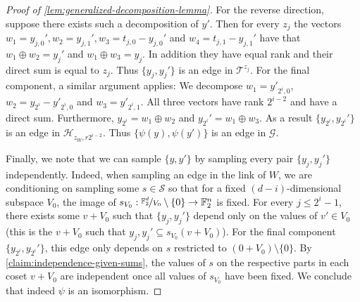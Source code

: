\documentclass[10pt,a4paper]{article}
\newcommand{\prettyref}[1]{\cref{#1}}
\theoremstyle{definition}
\theoremstyle{remark}
\newcommand{\set}[1]{\{#1\}}
\newcommand{\F}{\mathbb{F}}
\DeclareMathOperator{\rank}{rank}
\renewcommand{\leq}{\leqslant}
\numberwithin{equation}{section}
\let\pref=\prettyref
\begin{document}
\begin{proof}[Proof of \pref{lem:generalized-decomposition-lemma}]
    For the reverse direction, suppose there exists such a decomposition of \(y'\). Then for every \(z_j\) the vectors \(w_1 = y_{j,0}', w_2=y_{j,1}', w_3 = t_{j,0}-y_{j,0}'\) and \(w_4 = t_{j,1}-y_{j,1}'\) have that \(w_1\oplus w_2 = y_j'\) and \(w_1\oplus w_3 = y_j\). In addition they have equal rank and their direct sum is equal to \(z_j\). Thus \(\set{y_j,y_j'}\) is an edge in \(\mathcal{T}^{z_j}\). For the final component, a similar argument applies: We decompose \(w_1 = y'_{2^i,0}\), \(w_2 = y_{2^i}-y'_{2^i,0}\) and \(w_3 = y'_{2^i,1}\). All three vectors have rank \(2^{i-2}\) and have a direct sum. Furthermore, \(y_{2^i} = w_1\oplus w_2\) and \(y_{2^i}' = w_1 \oplus w_3\). As a result \(\set{y_{2^i},y_{2^i}'}\) is an edge in \(\mathcal{H}_{z_W,r2^{i-2}}\). Thus \(\set{\psi(y),\psi(y')}\) is an edge in \(\mathcal{G}\). 

    Finally, we note that we can sample \(\set{y,y'}\) by sampling every pair \(\set{y_j,y_j'}\) independently. Indeed, when sampling an edge in the link of \(W\), we are conditioning on sampling some \(s \in \mathcal{S}\) so that for a fixed \((d-i)\)-dimensional subspace \(V_0\), the image of \(s_{V_0}:\nicefrac{\F_2^d}{V_0} \setminus \set{0} \to \F_2^n\) is fixed. For every \(j \leq 2^i - 1\), there exists some \(v+V_0\) such that \(\set{y_j,y_j'}\) depend only on the values of \(v' \in V_0\) (this is the \(v+V_0\) such that \(y_j,y_j' \subseteq s_{V_0}(v+V_0)\)). For the final component \(\set{y_{2^i},y_{2^i}'}\), this edge only depends on \(s\) restricted to \((0+V_0) \setminus \set{0}\). By \pref{claim:independence-given-sums}, the values of \(s\) on the respective parts in each coset \(v+V_0\) are independent once all values of \(s_{V_0}\) have been fixed. We conclude that indeed \(\psi\) is an isomorphism.
\end{proof}
\end{document}
